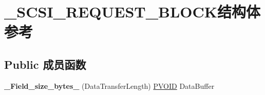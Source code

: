 \hypertarget{struct___s_c_s_i___r_e_q_u_e_s_t___b_l_o_c_k}{}\section{\+\_\+\+S\+C\+S\+I\+\_\+\+R\+E\+Q\+U\+E\+S\+T\+\_\+\+B\+L\+O\+C\+K结构体 参考}
\label{struct___s_c_s_i___r_e_q_u_e_s_t___b_l_o_c_k}
\subsection*{Public 成员函数}
\begin{DoxyCompactItemize}
\item 
\mbox{\label{struct___s_c_s_i___r_e_q_u_e_s_t___b_l_o_c_k_ad2f88b6cb45887930152ee52f763cb1b}} 
{\bfseries \+\_\+\+Field\+\_\+size\+\_\+bytes\+\_\+} (Data\+Transfer\+Length) \hyperlink{interfacevoid}{P\+V\+O\+ID} Data\+Buffer
\end{DoxyCompactItemize}
